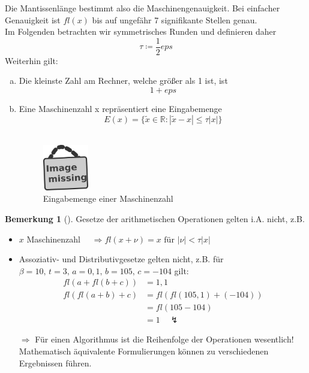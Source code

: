\documentclass[ngerman,fontsize=11pt, paper=a4, parskip=half, titlepage=true, toc=bib]{scrbook}
\theoremstyle{definition}
\newtheorem{Bem}[Def]{Bemerkung}	%
\theoremstyle{plain}
\newcommand{\R}{\mathds{R}}
\newenvironment{Beme}[1][]{ %
	\begin{Bem}[#1]
	}
	{
	\end{Bem}
	\addtocounter{subsection}{1}
}
\begin{document}
  Die Mantissenlänge bestimmt also die Maschinengenauigkeit. Bei einfacher Genauigkeit ist $fl(x)$ bis auf ungefähr 7 signifikante Stellen genau. \\
  Im Folgenden betrachten wir symmetrisches Runden und definieren daher
  \[ \tau \coloneqq \frac{1}{2}eps\]
  Weiterhin gilt:
  \begin{enumerate}[a)]
  \item Die kleinste Zahl am Rechner, welche größer als 1 ist, ist
    \[ 1 + eps \]
  \item Eine Maschinenzahl x repräsentiert eine Eingabemenge
    \[  E(x) = \{\widetilde{x} \in \R : |\widetilde{x}-x| \leq \tau|x|\} \] \\
    \begin{figure}
      \parbox{\linewidth}{
        \centering
        \includegraphics[width=2cm]{images/image_missing.jpg}
      }
      \caption{Eingabemenge einer Maschinenzahl}
    \end{figure}
  \end{enumerate}

  \begin{Beme}
  	\label{3.1.7}
  	Gesetze der arithmetischen Operationen gelten i.A. nicht, z.B.
  	\begin{itemize}
  		\item 	$x$ Maschinenzahl $\quad \Rightarrow fl(x+\nu) = x \text{     für }|\nu| < \tau |x|$
  		\item Assoziativ- und Distributivgesetze gelten nicht, z.B. für $\beta = 10, \, t=3, \, a=0,1 ,\, b= 105 , \, c= -104$ gilt:
  		\begin{align*}
  		fl(a+fl(b+c)) &= 1,1 \\
  		fl(fl(a+b)+c) &= fl(fl(105,1) + (-104) ) \\
  		&= fl(105-104) \\
  		&= 1 \quad \lightning
  		\end{align*}
  		\item[ $\Rightarrow$] Für einen Algorithmus ist die Reihenfolge der Operationen wesentlich!
  		Mathematisch äquivalente Formulierungen können zu verschiedenen Ergebnissen führen.
  	\end{itemize}
  \end{Beme}
\end{document}
